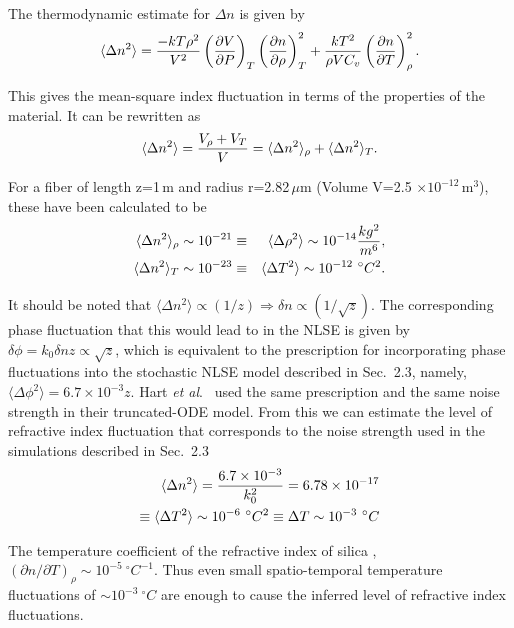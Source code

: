 The thermodynamic estimate for $\Delta n$ is given by \cite{glenn}
\begin{equation}
\langle \Delta n^{2} \rangle = {-kT\rho^2 \over V^2}
\left( {\partial V \over \partial P} \right)_{T}
\left( {\partial n \over \partial \rho} \right)_{T}^{2}
 + {kT^2 \over \rho VC_v} \left( {\partial n \over \partial T} \right)_{\rho}^2 .
\end{equation}

This gives the mean-square index fluctuation in terms of the properties of
the material. It can be rewritten as
\begin{equation}
\langle \Delta n^{2} \rangle = {V_{\rho}+V_T \over V} = \langle \Delta n^{2} \rangle_{\rho}+\langle \Delta n^{2} \rangle_{T} .
\end{equation}

For a fiber of length z=1\,m and radius r=2.82\,$\mu$m
(Volume V=2.5 $\times 10^{-12}$\,m$^3$), these have been calculated to be
\begin{eqnarray}
\langle \Delta n^2 \rangle_{\rho} \sim 10^{-21} & \equiv & \langle \Delta \rho^2 \rangle \sim 10^{-14}
{kg^2 \over m^6}, \nonumber \\
\langle \Delta n^2 \rangle_T \sim 10^{-23} & \equiv & \langle \Delta T^2 \rangle \sim 10^{-12}~{^\circ}C^2 .
\end{eqnarray}

It should be noted that $\langle \Delta n^2 \rangle \propto (1/z) \Rightarrow \delta n \propto  (1 / \sqrt{z})$. The corresponding phase fluctuation that this would lead to in the NLSE is given by $\delta \phi=k_{0} \delta n z \propto \sqrt {z}$, which is equivalent to the prescription for incorporating phase fluctuations into the stochastic NLSE model described in Sec.\ 2.3, namely,  $\langle \Delta \phi^2 \rangle = 6.7 \times 10^{-3}z$. Hart {\it et al}.\ \cite{hart1} used the same prescription and the same noise strength in their truncated-ODE model. From this we can estimate the level of refractive index fluctuation that corresponds to the noise strength used in the simulations described in Sec.\ 2.3
\begin{eqnarray}
\langle \Delta n^2 \rangle = {6.7 \times 10^{-3} \over k_0^2} = 6.78 \times 10^{-17} \nonumber\\
\equiv \langle \Delta T^{2} \rangle \sim 10^{-6}~{^\circ}C^2 \equiv \Delta T \sim 10^{-3}~{^\circ}C
\end{eqnarray}

The temperature coefficient of the refractive index of silica \cite{glenn},
$(\partial n / \partial T)_{\rho} \sim 10^{-5} ~{^\circ}C^{-1}$. Thus even small spatio-temporal temperature fluctuations of $\sim 10^{-3} ~{^\circ}C$ are enough to cause the inferred level of refractive index fluctuations.

